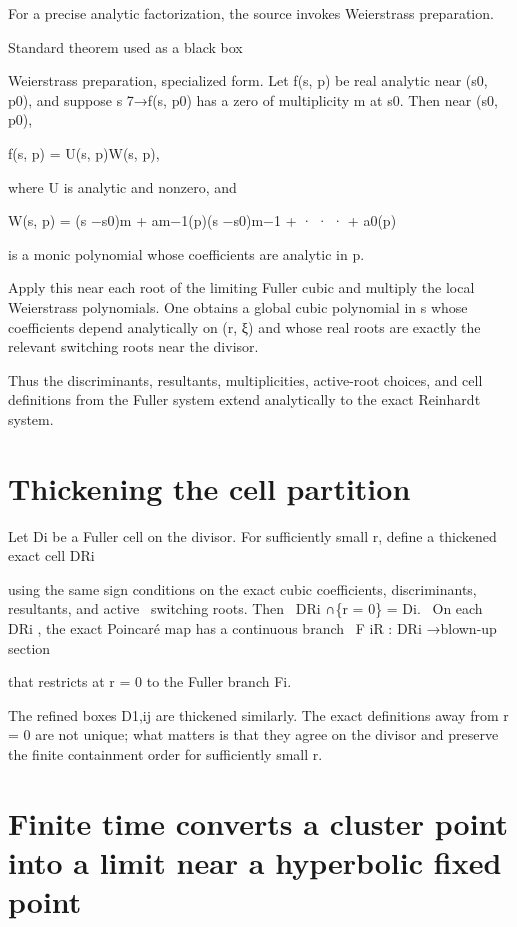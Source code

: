 For a precise analytic factorization, the source invokes Weierstrass preparation.


\begin{insightbox}{Standard theorem used as a black box}
\end{insightbox}

Weierstrass preparation, specialized form. Let f(s, p) be real analytic near (s0, p0), and suppose s 7→f(s, p0) has a zero of multiplicity m at s0. Then near (s0, p0),


f(s, p) = U(s, p)W(s, p),


where U is analytic and nonzero, and


W(s, p) = (s −s0)m + am−1(p)(s −s0)m−1 + · · · + a0(p)


is a monic polynomial whose coefficients are analytic in p.


Apply this near each root of the limiting Fuller cubic and multiply the local Weierstrass polynomials. One obtains a global cubic polynomial in s whose coefficients depend analytically on (r, ξ) and whose real roots are exactly the relevant switching roots near the divisor.


Thus the discriminants, resultants, multiplicities, active-root choices, and cell definitions from the Fuller system extend analytically to the exact Reinhardt system.


\section{Thickening the cell partition}

Let Di be a Fuller cell on the divisor. For sufficiently small r, define a thickened exact cell DRi


\begin{displaytext}
using the same sign conditions on the exact cubic coefficients, discriminants, resultants, and active \
switching roots. Then \
DRi ∩\{r = 0\} = Di. \
On each DRi , the exact Poincaré map has a continuous branch \
F iR : DRi →blown-up section
\end{displaytext}

that restricts at r = 0 to the Fuller branch Fi.


The refined boxes D1,ij are thickened similarly. The exact definitions away from r = 0 are not unique; what matters is that they agree on the divisor and preserve the finite containment order for sufficiently small r.


\section{Finite time converts a cluster point into a limit near a hyperbolic fixed point}

